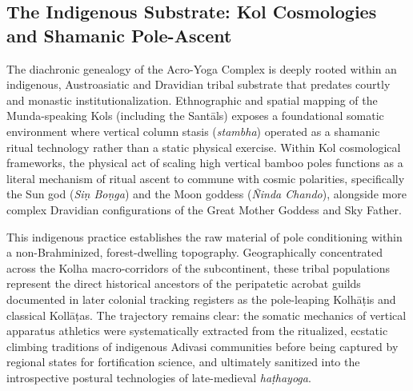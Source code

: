 \documentclass[11pt,twoside,letterpaper]{article}
\begin{document}
\subsection{The Indigenous Substrate: Kol Cosmologies and Shamanic Pole-Ascent}
The diachronic genealogy of the Acro-Yoga Complex is deeply rooted within an indigenous, Austroasiatic and Dravidian tribal substrate that predates courtly and monastic institutionalization. Ethnographic and spatial mapping of the Munda-speaking Kols (including the Santāls) exposes a foundational somatic environment where vertical column stasis (\textit{stambha}) operated as a shamanic ritual technology rather than a static physical exercise. Within Kol cosmological frameworks, the physical act of scaling high vertical bamboo poles functions as a literal mechanism of ritual ascent to commune with cosmic polarities, specifically the Sun god (\textit{Siṇ Boṇga}) and the Moon goddess (\textit{Ñinda Chando}), alongside more complex Dravidian configurations of the Great Mother Goddess and Sky Father.

This indigenous practice establishes the raw material of pole conditioning within a non-Brahminized, forest-dwelling topography. Geographically concentrated across the Kolha macro-corridors of the subcontinent, these tribal populations represent the direct historical ancestors of the peripatetic acrobat guilds documented in later colonial tracking registers as the pole-leaping Kolhāṭis and classical Kollāṭas. The trajectory remains clear: the somatic mechanics of vertical apparatus athletics were systematically extracted from the ritualized, ecstatic climbing traditions of indigenous Adivasi communities before being captured by regional states for fortification science, and ultimately sanitized into the introspective postural technologies of late-medieval \textit{haṭhayoga}.
\end{document}
